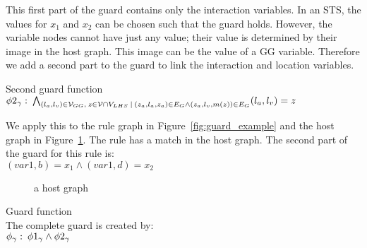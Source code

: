 This first part of the guard contains only the interaction variables. In an STS, the values for $x_1$ and $x_2$ can be chosen such that the guard holds. However, the variable nodes cannot have just any value; their value is determined by their image in the host graph. This image can be the value of a GG variable. Therefore we add a second part to the guard to link the interaction and location variables.
\vspace{10px}\begin{definition} Second guard function
\vspace{2px} \\
$\phi 2_{\gamma}:\: \bigwedge_{(l_a, l_v) \in \mathcal{V}_{GG},\: z \in \mathcal{V} \cap V_{LHS}\: |\: (z_a, l_a, z_a) \in E_{G} \land (z_a, l_v, m(z)) \in E_{G}} (l_a, l_v) = z$
\end{definition}
\vspace{10px}
We apply this to the rule graph in Figure~\ref{fig:guard_example} and the host graph in Figure~\ref{fig:guard_example_host}. The rule has a match in the host graph. The second part of the guard for this rule is:
\vspace{5px} \\
$(var1,b) = x_1 \land (var1,d) = x_2$

\begin{figure}[h]
  \begin{center}
    
  \end{center}
  \caption{a host graph}
  \label{fig:guard_example_host}
\end{figure}

\vspace{10px}\begin{definition}\label{def:guard} Guard function \\
The complete guard is created by:
\vspace{5px} \\
$\phi_{\gamma}:\:\phi 1_{\gamma} \land \phi 2_{\gamma}$
\end{definition}

